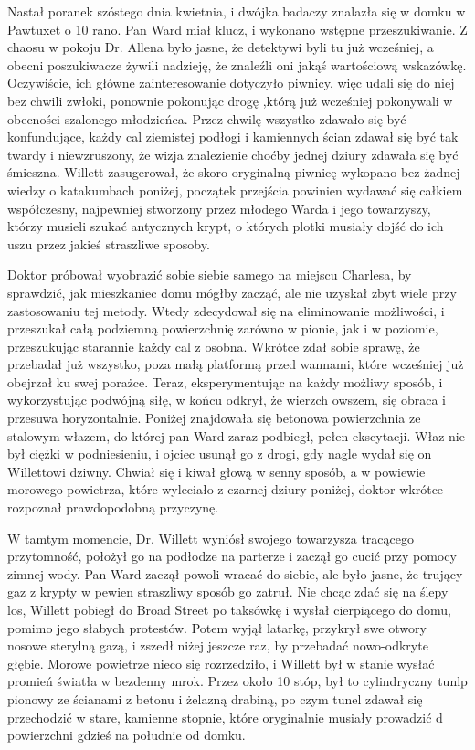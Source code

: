 Nastał poranek szóstego dnia kwietnia, i dwójka badaczy znalazła się w domku w Pawtuxet o 10 rano. Pan Ward miał klucz, i wykonano wstępne przeszukiwanie. Z chaosu w pokoju Dr. Allena było jasne, że detektywi byli tu już wcześniej, a obecni poszukiwacze żywili nadzieję, że znaleźli oni jakąś wartościową wskazówkę. Oczywiście, ich główne zainteresowanie dotyczyło piwnicy, więc udali się do niej bez chwili zwłoki, ponownie pokonując drogę ,którą już wcześniej pokonywali w obecności szalonego młodzieńca. Przez chwilę wszystko zdawało się być konfundujące, każdy cal ziemistej podłogi i kamiennych ścian zdawał się być tak twardy i niewzruszony, że wizja znalezienie choćby jednej dziury zdawała się być śmieszna. Willett zasugerował, że skoro oryginalną piwnicę wykopano bez żadnej wiedzy o katakumbach poniżej, początek przejścia powinien wydawać się całkiem współczesny, najpewniej stworzony przez młodego Warda i jego towarzyszy, którzy musieli szukać antycznych krypt, o których plotki musiały dojść do ich uszu przez jakieś straszliwe sposoby. 

Doktor próbował wyobrazić sobie siebie samego na miejscu Charlesa, by sprawdzić, jak mieszkaniec domu mógłby zacząć, ale nie uzyskał zbyt wiele przy zastosowaniu tej metody. Wtedy zdecydował się na eliminowanie możliwości, i przeszukał całą podziemną powierzchnię zarówno w pionie, jak i w poziomie, przeszukując starannie każdy cal z osobna. Wkrótce zdał sobie sprawę, że przebadał już wszystko, poza małą platformą przed wannami, które wcześniej już obejrzał ku swej porażce. Teraz, eksperymentując na każdy możliwy sposób, i wykorzystując podwójną siłę, w końcu odkrył, że wierzch owszem, się obraca i przesuwa horyzontalnie. Poniżej znajdowała się betonowa powierzchnia ze stalowym włazem, do której pan Ward zaraz podbiegł, pełen ekscytacji. Właz nie był ciężki w podniesieniu, i ojciec usunął go z drogi, gdy nagle wydał się on Willettowi dziwny. Chwiał się i kiwał głową w senny sposób, a w powiewie morowego powietrza, które wyleciało z czarnej dziury poniżej, doktor wkrótce rozpoznał prawdopodobną przyczynę. 

W tamtym momencie, Dr. Willett wyniósł swojego towarzysza tracącego przytomność, położył go na podłodze na parterze i zaczął go cucić przy pomocy zimnej wody. Pan Ward zaczął powoli wracać do siebie, ale było jasne, że trujący gaz z krypty w pewien straszliwy sposób go zatruł. Nie chcąc zdać się na ślepy los, Willett pobiegł do Broad Street po taksówkę i wysłał cierpiącego do domu, pomimo jego słabych protestów. Potem wyjął latarkę, przykrył swe otwory nosowe sterylną gazą, i zszedł niżej jeszcze raz, by przebadać nowo-odkryte głębie. Morowe powietrze nieco się rozrzedziło, i Willett był w stanie wysłać promień światła w bezdenny mrok. Przez około 10 stóp, był to cylindryczny tunlp pionowy ze ścianami z betonu i żelazną drabiną, po czym tunel zdawał się przechodzić w stare, kamienne stopnie, które oryginalnie musiały prowadzić d powierzchni gdzieś na południe od domku.

